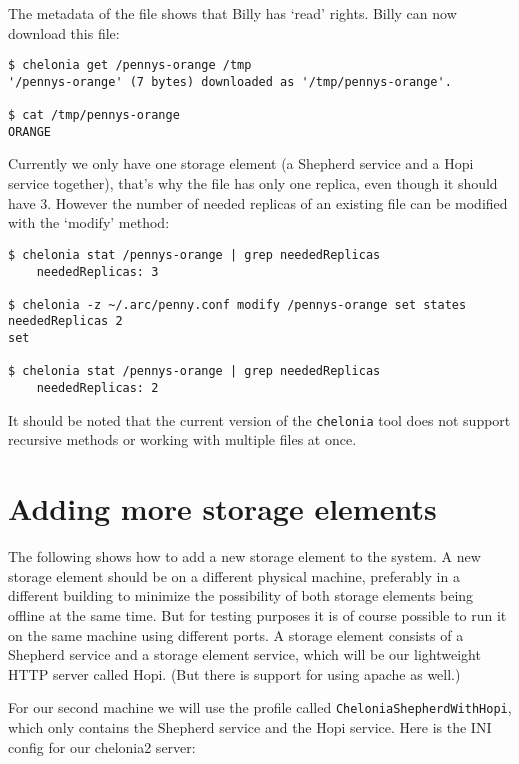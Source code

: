 \documentclass{article}
\begin{document}
The metadata of the file shows that Billy has `read' rights. Billy can now download this file:

\begin{verbatim}
$ chelonia get /pennys-orange /tmp
'/pennys-orange' (7 bytes) downloaded as '/tmp/pennys-orange'.

$ cat /tmp/pennys-orange 
ORANGE
\end{verbatim}

Currently we only have one storage element (a Shepherd service and a Hopi service together), that's why the file has only one replica, even though it should have 3. However the number of needed replicas of an existing file can be modified with the `modify' method:

\begin{verbatim}
$ chelonia stat /pennys-orange | grep neededReplicas
    neededReplicas: 3
    
$ chelonia -z ~/.arc/penny.conf modify /pennys-orange set states neededReplicas 2
set

$ chelonia stat /pennys-orange | grep neededReplicas
    neededReplicas: 2
\end{verbatim}

It should be noted that the current version of the \verb!chelonia! tool does not support recursive methods or working with multiple files at once.

\section{Adding more storage elements}

The following shows how to add a new storage element to the system. A new storage element should be on a different physical machine, preferably in a different building to minimize the possibility of both storage elements being offline at the same time. But for testing purposes it is of course possible to run it on the same machine using different ports. A storage element consists of a Shepherd service and a storage element service, which will be our lightweight HTTP server called Hopi. (But there is support for using apache as well.)

For our second machine we will use the profile called \verb!CheloniaShepherdWithHopi!, which only contains the Shepherd service and the Hopi service. Here is the INI config for our chelonia2 server:
\end{document}
